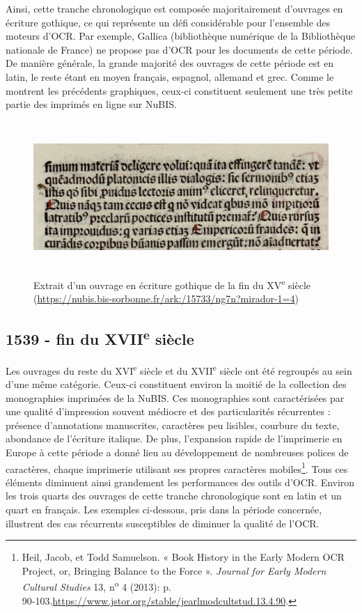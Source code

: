 \documentclass[a4paper,12pt,twoside]{book}
\begin{document}
Ainsi, cette tranche chronologique est composée majoritairement
d'ouvrages en écriture gothique, ce qui représente un
défi considérable pour l'ensemble des moteurs d'OCR. Par exemple,
Gallica (bibliothèque numérique de la Bibliothèque nationale de France)
ne propose pas d'OCR pour les documents de cette période. De manière
générale, la grande majorité des ouvrages de cette période est en latin,
le reste étant en moyen français, espagnol, allemand et grec. Comme le
montrent les précédents graphiques, ceux-ci constituent seulement une
très petite partie des imprimés en ligne sur NuBIS. \\

\begin{figure} [H]
	\includegraphics[width=6.26806in,height=2.26389in]{vertopal_157ae480aa4a4b07be198b586a812241/media/image6.png}
	
	\caption{Extrait d'un ouvrage en écriture gothique de la fin du
		XV\textsuperscript{e} siècle
		(\url{https://nubis.bis-sorbonne.fr/ark:/15733/ng7n?mirador-1=4})}
\end{figure}


\subsection{1539 - fin du XVII\textsuperscript{e} siècle}

Les ouvrages du reste du XVI\textsuperscript{e} siècle et du
XVII\textsuperscript{e} siècle ont été regroupés au sein d'une même
catégorie. Ceux-ci constituent environ la moitié de la collection des
monographies imprimées de la NuBIS. Ces monographies sont caractérisées
par une qualité d'impression souvent médiocre et des particularités
récurrentes : présence d'annotations manuscrites, caractères peu
lisibles, courbure du texte, abondance de l'écriture italique. De plus,
l'expansion rapide de l'imprimerie en Europe à cette période a donné
lieu au développement de nombreuses polices de caractères, chaque
imprimerie utilisant ses propres caractères mobiles\footnote{Heil,
	Jacob, et Todd Samuelson. « Book History in the Early Modern OCR
	Project, or, Bringing Balance to the Force ». \emph{Journal for Early
		Modern Cultural Studies} 13, n\textsuperscript{o} 4 (2013): p.
	90‑103.\url{https://www.jstor.org/stable/jearlmodcultstud.13.4.90}.}.
Tous ces éléments diminuent ainsi grandement les performances des outils
d'OCR. Environ les trois quarts des ouvrages de cette tranche
chronologique sont en latin et un quart en français. Les exemples
ci-dessous, pris dans la période concernée, illustrent des cas
récurrents susceptibles de diminuer la qualité de l'OCR.
\end{document}
